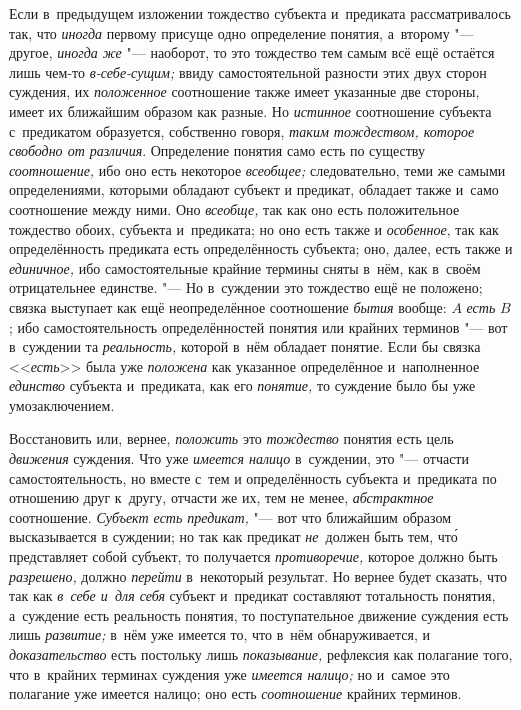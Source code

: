 Если в~предыдущем изложении тождество субъекта и~предиката рассматривалось так,
что {\em иногда} первому присуще одно определение понятия,
а~второму "--- другое, {\em иногда же} "--- наоборот, то это тождество тем
самым всё ещё остаётся лишь чем-то {\em в-себе-сущим;} ввиду самостоятельной
разности этих двух сторон суждения, их {\em положенное} соотношение также имеет
указанные две стороны, имеет их ближайшим образом как разные. Но {\em истинное}
соотношение субъекта с~предикатом образуется, собственно говоря,
{\em таким тождеством, которое свободно от различия}. Определение понятия само
есть по существу {\em соотношение,} ибо оно есть некоторое {\em всеобщее;}
следовательно, теми же самыми определениями, которыми обладают субъект и
предикат, обладает также и~само соотношение между ними. Оно {\em всеобще,}
так как оно есть положительное тождество обоих, субъекта и~предиката; но оно
есть также и {\em особенное},
так как определённость предиката есть определённость субъекта; оно, далее, есть
также и {\em единичное,} ибо самостоятельные крайние термины сняты в~нём, как
в~своём отрицательнее единстве. "--- Но в~суждении это тождество ещё не
положено; связка выступает как ещё неопределённое соотношение {\em бытия}
вообще: $A$ {\em есть} $B$; ибо самостоятельность определённостей понятия или
крайних терминов "--- вот в~суждении та {\em реальность,} которой в~нём
обладает понятие. Если бы связка <<{\em есть}>> была уже {\em положена} как
указанное определённое и~наполненное {\em единство} субъекта и~предиката, как
его {\em понятие,} то суждение было бы уже умозаключением.

Восстановить или, вернее, {\em положить} это {\em тождество} понятия есть цель
{\em движения} суждения. Что уже {\em имеется налицо} в~суждении,
это "--- отчасти самостоятельность, но вместе с~тем и
определённость субъекта и~предиката по отношению друг к~другу, отчасти же
их, тем не менее, {\em абстрактное} соотношение.
{\em Субъект есть предикат,} "--- вот что ближайшим образом высказывается в
суждении; но так как предикат {\em не}~должен быть тем, чт\'{о}
представляет собой субъект, то получается {\em противоречие,} которое должно
быть {\em разрешено,} должно {\em перейти} в~некоторый результат. Но вернее
будет сказать, что так как {\em в~себе и~для себя} субъект и~предикат
составляют тотальность понятия, а~суждение есть реальность понятия, то
поступательное движение суждения есть лишь {\em развитие;} в~нём уже
имеется то, что в~нём обнаруживается, и {\em доказательство} есть
постольку лишь {\em показывание,} рефлексия как полагание того, что в~крайних
терминах суждения уже {\em имеется налицо;} но и~самое это полагание уже
имеется налицо; оно есть {\em соотношение} крайних терминов.

